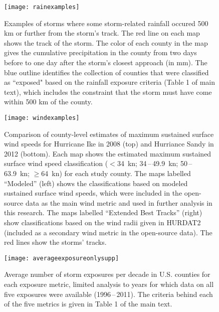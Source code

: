 \documentclass[11pt, titlepage, twoside]{article}
\begin{document}
\begin{figure}[tbhp!]
\centering
\texttt{[image: rainexamples]}
\caption{Examples of storms where some storm-related rainfall occured
         500 \si{\kilo\metre} or further from the storm's track. 
	 The red line on each map shows the track of the storm. 
	 The color of each county in the map gives the cumulative 
	 precipitation in the county from two days before to one day after
	 the storm's closest approach (in \si{\milli\metre}). The blue 
	 outline identifies the collection of counties
	 that were classified as ``exposed" based on the rainfall exposure 
	 criteria (Table 1 of main text), which includes the constraint
	 that the storm must have come within 500 \si{\kilo\metre} of the 
	 county. }
\label{fig:rainexamples}
\end{figure}

\clearpage 

\begin{figure}[tbhp!]
\centering
\texttt{[image: windexamples]}
\caption{Comparison of county-level estimates of maximum sustained surface wind speeds
	for Hurricane Ike in 2008 (top) and Hurriance Sandy in 2012 (bottom). 
	Each map shows the estimated maximum sustained surface wind speed 
	classification ($<$34~\si{\knot}; 34\,--\,49.9~\si{\knot}; 
	50\,--\,63.9~\si{\knot}; $\ge$64~\si{\knot}) for each study county. 
	The maps labelled ``Modeled'' (left)
	shows the classifications based on modeled sustained surface wind
	speeds, which were included in the open-source data as the main 
	wind metric and used in further analysis in this research. The maps
	labelled ``Extended Best Tracks'' (right) show classifications based on the 
	wind radii given in \ac{HURDAT2} (included as a secondary wind 
	metric in the open-source data). The red lines show the storms' 
	tracks.
	}
\label{fig:windexamples}
\end{figure}

\clearpage

\begin{figure}[tbhp!]
\centering
\texttt{[image: averageexposureonlysupp]}
\caption{Average number of storm exposures per decade in U.S. counties for each 
	exposure metric, limited analysis to years for which data on all five 
	exposures were available (1996\,--\,2011). The criteria behind each of 
	the five metrics is given in Table 1 of the main text. 	
	} 
\label{fig:averageexposuresupp}
\end{figure}
\end{document}
